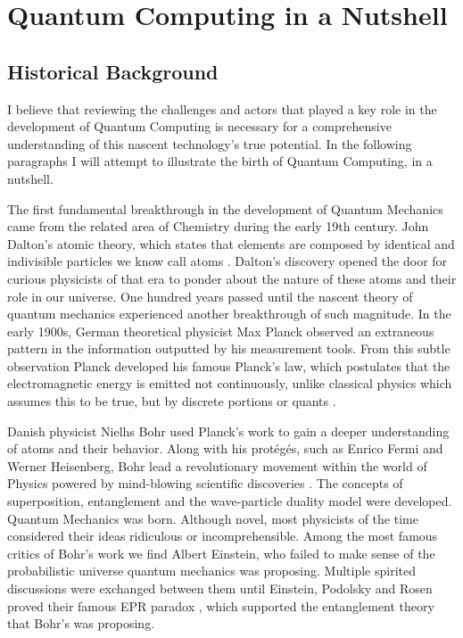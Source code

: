 \chapter{Quantum Computing in a Nutshell}
\section{Historical Background}
I believe that reviewing the challenges and actors that played a key role in the development of Quantum Computing is necessary for a comprehensive understanding of this nascent technology's true potential. In the following paragraphs I will attempt to illustrate the birth of Quantum Computing, in a nutshell. 

The first fundamental breakthrough in the development of Quantum Mechanics came from the related area of Chemistry during the early 19th century. John Dalton's atomic theory, which states that elements are composed by identical and indivisible particles we know call atoms \cite{daltons_2014}. Dalton's discovery opened the door for curious physicists of that era to ponder about the nature of these atoms and their role in our universe. One hundred years passed until the nascent theory of quantum mechanics experienced another breakthrough of such magnitude. In the early 1900s, German theoretical physicist Max Planck observed an extraneous pattern in the information outputted by his measurement tools. From this subtle observation Planck developed his famous Planck's law, which postulates that the electromagnetic energy is emitted not continuously, unlike classical physics which assumes this to be true, but by discrete portions or quants \cite{khairoutdinov_plancks_2012}.

Danish physicist Nielhs Bohr used Planck's work to gain a deeper understanding of atoms and their behavior. Along with his protégés, such as Enrico Fermi and Werner Heisenberg, Bohr lead a revolutionary movement within the world of Physics powered by mind-blowing scientific discoveries \cite{loeffler_niels_2018}. The concepts of superposition, entanglement and the wave-particle duality model were developed. Quantum Mechanics was born. Although novel, most physicists of the time considered their ideas ridiculous or incomprehensible. Among the most famous critics of Bohr's work we find Albert Einstein, who failed to make sense of the probabilistic universe quantum mechanics was proposing. Multiple spirited discussions were exchanged between them until Einstein, Podolsky and Rosen proved their famous EPR paradox \cite{epr_paradox}, which supported the entanglement theory that Bohr's was proposing.

